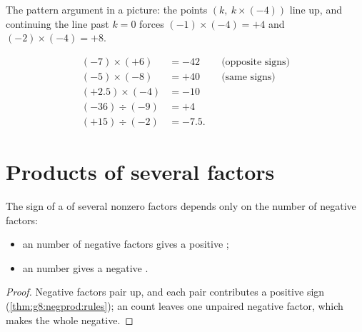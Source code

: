 \begin{omfigure}

{\small The pattern argument in a picture: the points
$(k,\ k \times (-4))$ line up, and continuing the line past $k = 0$
forces $(-1)\times(-4) = +4$ and $(-2)\times(-4) = +8$.}
\end{omfigure}

\begin{example}\label{ex:g8:negprod:products}
\begin{align*}
(-7) \times (+6) &= -42 && \text{(opposite signs)} \\
(-5) \times (-8) &= +40 && \text{(same signs)} \\
(+2.5) \times (-4) &= -10 \\
(-36) \div (-9) &= +4 \\
(+15) \div (-2) &= -7.5 .
\end{align*}
\end{example}

\section{Products of several factors}

\begin{proposition}\label{prop:g8:negprod:many}
The sign of a  of several nonzero factors depends only on the
number of negative factors:
\begin{itemize}
  \item an \emph{} number of negative factors gives a positive
        ;
  \item an \emph{} number gives a negative .
\end{itemize}
\end{proposition}

\begin{proof}
Negative factors pair up, and each pair contributes a positive sign
(\cref{thm:g8:negprod:rules}); an  count leaves one unpaired
negative factor, which makes the whole  negative.
\end{proof}

